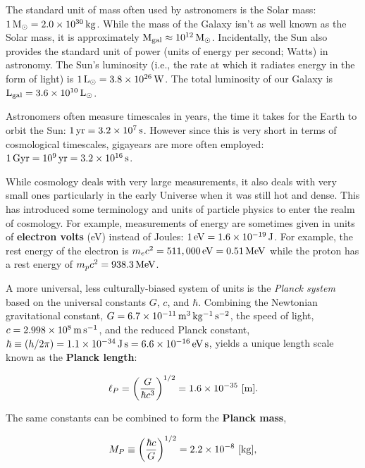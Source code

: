 \documentclass[a4paper,11pt]{article}
\begin{document}
The standard unit of mass often used by astronomers is the Solar mass: $1\,{\rm M}_\odot = 2.0\times10^{30}\,{\rm kg}$. While the mass of the Galaxy isn't as well known as the Solar mass, it is approximately ${\rm M}_\mathrm{gal} \approx 10^{12}\,{\rm M}_\odot$. Incidentally, the Sun also provides the standard unit of power (units of energy per second; Watts) in astronomy. The Sun's luminosity (i.e., the rate at which it radiates energy in the form of light) is $1\,{\rm L}_\odot = 3.8\times10^{26}\,{\rm W}$. The total luminosity of our Galaxy is ${\rm L}_\mathrm{gal} = 3.6\times10^{10}\,{\rm L}_\odot$.

Astronomers often measure timescales in years, the time it takes for the Earth to orbit the Sun: $1\,{\rm yr} = 3.2\times10^7\,{\rm s}$. However since this is very short in terms of cosmological timescales, gigayears are more often employed: $1\,{\rm Gyr} = 10^9\,{\rm yr} = 3.2\times10^{16}\,{\rm s}$. 

While cosmology deals with very large measurements, it also deals with very small ones particularly in the early Universe when it was still hot and dense. This has introduced some terminology and units of particle physics to enter the realm of cosmology. For example, measurements of energy are sometimes given in units of \textbf{electron volts} (eV) instead of Joules: $1\,{\rm eV} = 1.6\times10^{-19}\,{\rm J}$. For example, the rest energy of the electron is $m_ec^2 = 511,000\,{\rm eV} = 0.51\,{\rm MeV}$ while the proton has a rest energy of $m_pc^2 = 938.3\,{\rm MeV}$.

A more universal, less culturally-biased system of units is the \textit{Planck system} based on the universal constants $G$, $c$, and $\hbar$. Combining the Newtonian gravitational constant, $G = 6.7\times10^{-11}\,{\rm m^3\,kg^{-1}\,s^{-2}}$, the speed of light, $c = 2.998\times10^8\,{\rm m\,s^{-1}}$, and the reduced Planck constant, $\hbar \equiv (h/2\pi) = 1.1\times10^{-34}\,{\rm J\,s} = 6.6\times10^{-16}\,{\rm eV\,s}$, yields a unique length scale known as the \textbf{Planck length}:

\begin{align*}
    \ell_P = \left( \frac{G}{\hbar c^3} \right)^{1/2} = 1.6\times10^{-35} ~ [{\rm m}].
\end{align*}

{\noindent}The same constants can be combined to form the \textbf{Planck mass},

\begin{align*}
    M_P \equiv \left( \frac{\hbar c}{G} \right)^{1/2} = 2.2\times10^{-8} ~ [{\rm kg}],
\end{align*}
\end{document}
